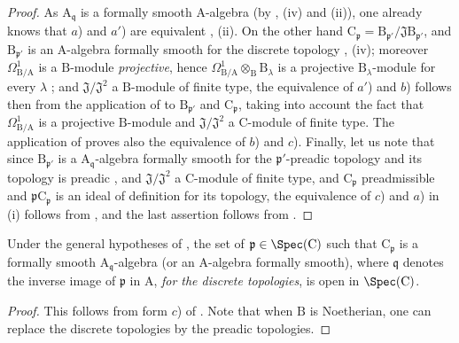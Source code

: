 \begin{proof}
As $\mathrm{A}_{\mathfrak{q}}$ is a formally smooth $\mathrm{A}$-algebra (by , (iv) and (ii)), one already knows that $a$) and $a'$) are equivalent , (ii).
On the other hand $\mathrm{C}_\mathfrak{p}=\mathrm{B}_{\mathfrak{p}'}/\mathfrak{J}\mathrm{B}_{\mathfrak{p}'}$, and $\mathrm{B}_{\mathfrak{p}'}$ is an $\mathrm{A}$-algebra formally smooth for the discrete topology , (iv); moreover $\Omega^1_{\mathrm{B}/\mathrm{A}}$ is a $\mathrm{B}$-module \emph{projective}, hence $\Omega^1_{\mathrm{B}/\mathrm{A}}\otimes_\mathrm{B}\mathrm{B}_\lambda$ is a projective $\mathrm{B}_\lambda$-module for every $\lambda$ ; and $\mathfrak{J}/\mathfrak{J}^2$ a $\mathrm{B}$-module of finite type, the equivalence of $a'$) and $b$) follows then from the application of  to $\mathrm{B}_{\mathfrak{p}'}$ and $\mathrm{C}_\mathfrak{p}$, taking into account the fact that $\Omega^1_{\mathrm{B}/\mathrm{A}}$ is a projective $\mathrm{B}$-module  and $\mathfrak{J}/\mathfrak{J}^2$ a $\mathrm{C}$-module of finite type.
The application of  proves also the equivalence of $b$) and $c$).
Finally, let us note that since $\mathrm{B}_{\mathfrak{p}'}$ is a $\mathrm{A}_{\mathfrak{q}}$-algebra formally smooth for the $\mathfrak{p}'$-preadic topology and its topology is preadic , and $\mathfrak{J}/\mathfrak{J}^2$ a $\mathrm{C}$-module of finite type, and $\mathrm{C}_\mathfrak{p}$ preadmissible and $\mathfrak{p}\mathrm{C}_\mathfrak{p}$ is an ideal of definition for its topology, the equivalence of $c$) and $a$) in (i) follows from , and the last assertion follows from .
\end{proof}

\begin{corollary}[22.6.5]
\label{0.22.6.5}
Under the general hypotheses of , the set of $\mathfrak{p}\in\Spec(\mathrm{C})$ such that $\mathrm{C}_\mathfrak{p}$ is a formally smooth $\mathrm{A}_{\mathfrak{q}}$-algebra (or an $\mathrm{A}$-algebra formally smooth), where $\mathfrak{q}$ denotes the inverse image of $\mathfrak{p}$ in $\mathrm{A}$, \emph{for the discrete topologies}, is open in $\Spec(\mathrm{C})$.
\end{corollary}

\begin{proof}
This follows from form $c$) of .
Note that when $\mathrm{B}$ is Noetherian, one can replace the discrete topologies by the preadic topologies.
\end{proof}

